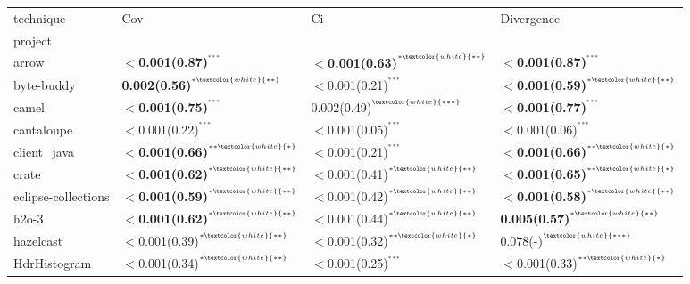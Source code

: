 \begin{tabular}{llll}
\toprule
technique &                                                           Cov &                                                            Ci &                                                    Divergence \\
project             &                                                               &                                                               &                                                               \\
\midrule
arrow               &  \textbf{$<$0.001(0.87)}\tiny{$^{^{***}}$} &  \textbf{$<$0.001(0.63)}\tiny{$^{^{*\textcolor{white}{**}}}$} &  \textbf{$<$0.001(0.87)}\tiny{$^{^{***}}$} \\
byte-buddy          &  \textbf{0.002(0.56)}\tiny{$^{^{*\textcolor{white}{**}}}$} &  $<$0.001(0.21)\tiny{$^{^{***}}$} &  \textbf{$<$0.001(0.59)}\tiny{$^{^{*\textcolor{white}{**}}}$} \\
camel               &  \textbf{$<$0.001(0.75)}\tiny{$^{^{***}}$} &  0.002(0.49)\tiny{$^{^{\textcolor{white}{***}}}$} &  \textbf{$<$0.001(0.77)}\tiny{$^{^{***}}$} \\
cantaloupe          &  $<$0.001(0.22)\tiny{$^{^{***}}$} &  $<$0.001(0.05)\tiny{$^{^{***}}$} &  $<$0.001(0.06)\tiny{$^{^{***}}$} \\
client_java         &  \textbf{$<$0.001(0.66)}\tiny{$^{^{**\textcolor{white}{*}}}$} &  $<$0.001(0.21)\tiny{$^{^{***}}$} &  \textbf{$<$0.001(0.66)}\tiny{$^{^{**\textcolor{white}{*}}}$} \\
crate               &  \textbf{$<$0.001(0.62)}\tiny{$^{^{*\textcolor{white}{**}}}$} &  $<$0.001(0.41)\tiny{$^{^{*\textcolor{white}{**}}}$} &  \textbf{$<$0.001(0.65)}\tiny{$^{^{**\textcolor{white}{*}}}$} \\
eclipse-collections &  \textbf{$<$0.001(0.59)}\tiny{$^{^{*\textcolor{white}{**}}}$} &  $<$0.001(0.42)\tiny{$^{^{*\textcolor{white}{**}}}$} &  \textbf{$<$0.001(0.58)}\tiny{$^{^{*\textcolor{white}{**}}}$} \\
h2o-3               &  \textbf{$<$0.001(0.62)}\tiny{$^{^{*\textcolor{white}{**}}}$} &  $<$0.001(0.44)\tiny{$^{^{*\textcolor{white}{**}}}$} &  \textbf{0.005(0.57)}\tiny{$^{^{*\textcolor{white}{**}}}$} \\
hazelcast           &  $<$0.001(0.39)\tiny{$^{^{*\textcolor{white}{**}}}$} &  $<$0.001(0.32)\tiny{$^{^{**\textcolor{white}{*}}}$} &  0.078(-)\tiny{$^{^{\textcolor{white}{***}}}$} \\
HdrHistogram        &  $<$0.001(0.34)\tiny{$^{^{*\textcolor{white}{**}}}$} &  $<$0.001(0.25)\tiny{$^{^{***}}$} &  $<$0.001(0.33)\tiny{$^{^{**\textcolor{white}{*}}}$} \\

\end{tabular}
